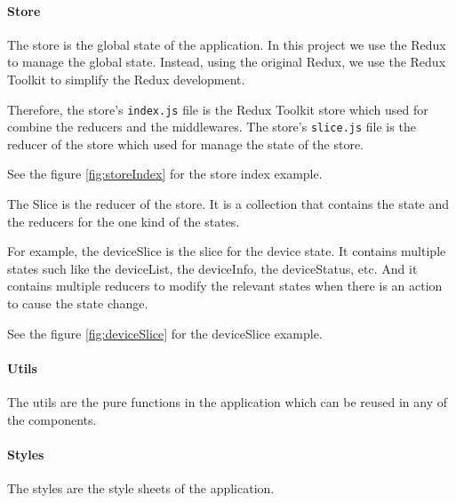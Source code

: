 

\paragraph{Store}
The store is the global state of the application. 
In this project we use the Redux to manage the global state.
Instead, using the original Redux, we use the Redux Toolkit to simplify the Redux development.

Therefore, the store's \texttt{index.js} file is the Redux Toolkit store 
which used for combine the reducers and the middlewares. 
The store's \texttt{slice.js} file is the reducer of the store 
which used for manage the state of the store. 

See the figure \ref{fig:storeIndex} for the store index example. 

The Slice is the reducer of the store. 
It is a collection that contains the state and the reducers for the one kind of the states.

For example, the deviceSlice is the slice for the device state. 
It contains multiple states such like the deviceList, the deviceInfo, the deviceStatus, etc.
And it contains multiple reducers to modify the relevant states when there is an action to cause the state change.

See the figure \ref{fig:deviceSlice} for the deviceSlice example.




\paragraph{Utils}
The utils are the pure functions in the application which can be reused in any of the components.

\paragraph{Styles}
The styles are the style sheets of the application.

\pagebreak